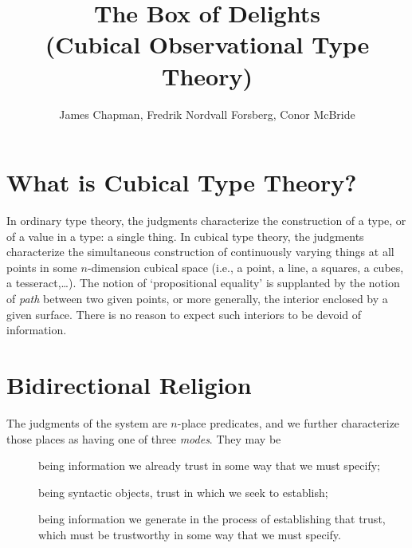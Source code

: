 \documentclass{article}
\begin{document}
\title{The Box of Delights\\
       (Cubical Observational Type Theory)}
\author{James Chapman, Fredrik Nordvall Forsberg, Conor McBride}
\maketitle

\newcommand{\V}[1]{\purple{\mathit{#1}}}
\newcommand{\JF}[1]{\framebox{\ensuremath{#1}}}
\newcommand{\sv}[1]{\purple{(\!\black{#1}\!)}}
\newcommand{\myv}{\overline}


\section{What is Cubical Type Theory?}

In ordinary type theory, the judgments characterize the construction of a type, or of a value in a type: a single thing. In cubical type theory, the judgments characterize the simultaneous construction of continuously varying things at all points in some $n$-dimension cubical space (i.e., a point, a line, a squares, a cubes, a tesseract,\ldots). The notion of `propositional equality' is supplanted by the notion of \emph{path} between two given points,
or more generally, the interior enclosed by a given surface. There is no reason to expect
such interiors to be devoid of information.


\section{Bidirectional Religion}

\newcommand{\INP}[1]{\aquaFG{#1}}
\newcommand{\SUB}[1]{\orange{#1}}
\newcommand{\OUP}[1]{\pinkFG{#1}}
\newcommand{\FIND}[1]{\dashv #1}

The judgments of the system are $n$-place predicates, and we further characterize those
places as having one of three \emph{modes}. They may be
\begin{description}
\item[\INP{inputs}] being information we already trust in some way that we must specify;
\item[\SUB{subjects}] being syntactic objects, trust in which we seek to establish;
\item[\OUP{outputs}] being information we generate in the process of establishing that trust, which must be trustworthy in some way that we must specify.
\end{description}
\end{document}
